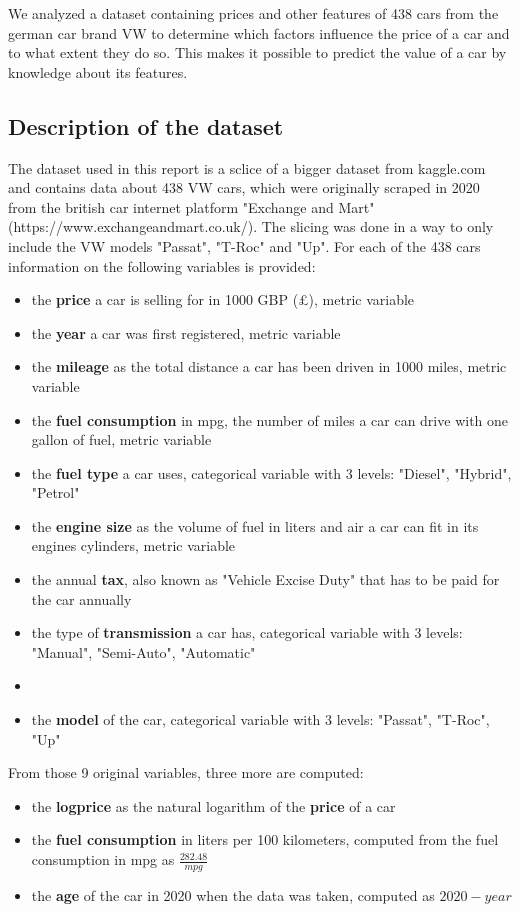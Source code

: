 \documentclass[12 pt]{scrartcl}
\begin{document}
We analyzed a dataset containing prices and other features of 438 cars from the german car brand VW to determine which factors influence the price of a car and to what extent they do so. This makes it possible to predict the value of a car by knowledge about its features.

\subsection{Description of the dataset}

The dataset used in this report is a sclice of a bigger dataset from kaggle.com and contains data about 438 VW cars, which were originally scraped in 2020 from the british car internet platform "Exchange and Mart" \citep{Exchangeandmart} (https://www.exchangeandmart.co.uk/). The slicing was done in a way to only include the VW models "Passat", "T-Roc" and "Up".
For each of the 438 cars information on the following variables is provided:
\begin{itemize}
  \item the \textbf{price} a car is selling for in 1000 GBP (£), metric variable
  \item the \textbf{year} a car was first registered, metric variable
  \item the \textbf{mileage} as the total distance a car has been driven in 1000 miles, metric variable
  \item the \textbf{fuel consumption} in mpg, the number of miles a car can drive with one gallon of fuel, metric variable
  \item the \textbf{fuel type} a car uses, categorical variable with 3 levels: "Diesel", "Hybrid", "Petrol"
  \item the \textbf{engine size} as the volume of fuel in liters and air a car can fit in its engines cylinders, metric variable
  \item the annual \textbf{tax}, also known as "Vehicle Excise Duty" that has to be paid for the car annually
  \item the type of \textbf{transmission} a car has, categorical variable with 3 levels: "Manual", "Semi-Auto", "Automatic"
  \item \item the \textbf{model} of the car, categorical variable with 3 levels: "Passat", "T-Roc", "Up"
\end{itemize}
From those 9 original variables, three more are computed:
\begin{itemize}
  \item the \textbf{logprice} as the natural logarithm of the \textbf{price} of a car
  \item the \textbf{fuel consumption} in liters per 100 kilometers, computed from the fuel consumption in mpg as $\frac{282.48}{mpg}$
  \item the \textbf{age} of the car in 2020 when the data was taken, computed as $2020-year$
\end{itemize}
\end{document}
